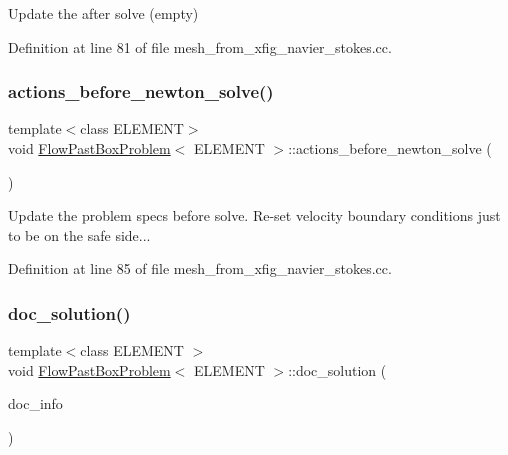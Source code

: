 Update the after solve (empty) 



Definition at line 81 of file mesh\+\_\+from\+\_\+xfig\+\_\+navier\+\_\+stokes.\+cc.

\mbox{\label{classFlowPastBoxProblem_a602772b5e37d5bd426d64e46cc3f59ea}} 
\subsubsection{\texorpdfstring{actions\+\_\+before\+\_\+newton\+\_\+solve()}{actions\_before\_newton\_solve()}}
{\footnotesize\ttfamily template$<$class E\+L\+E\+M\+E\+NT$>$ \\
void \hyperlink{classFlowPastBoxProblem}{Flow\+Past\+Box\+Problem}$<$ E\+L\+E\+M\+E\+NT $>$\+::actions\+\_\+before\+\_\+newton\+\_\+solve (\begin{DoxyParamCaption}{ }\end{DoxyParamCaption})\hspace{0.3cm}{\ttfamily [inline]}}



Update the problem specs before solve. Re-\/set velocity boundary conditions just to be on the safe side... 



Definition at line 85 of file mesh\+\_\+from\+\_\+xfig\+\_\+navier\+\_\+stokes.\+cc.

\mbox{\label{classFlowPastBoxProblem_a7e2f3692ab8f492c6d5e967953c4a4ea}} 
\subsubsection{\texorpdfstring{doc\+\_\+solution()}{doc\_solution()}}
{\footnotesize\ttfamily template$<$class E\+L\+E\+M\+E\+NT $>$ \\
void \hyperlink{classFlowPastBoxProblem}{Flow\+Past\+Box\+Problem}$<$ E\+L\+E\+M\+E\+NT $>$\+::doc\+\_\+solution (\begin{DoxyParamCaption}\item[{Doc\+Info \&}]{doc\+\_\+info }\end{DoxyParamCaption})}



